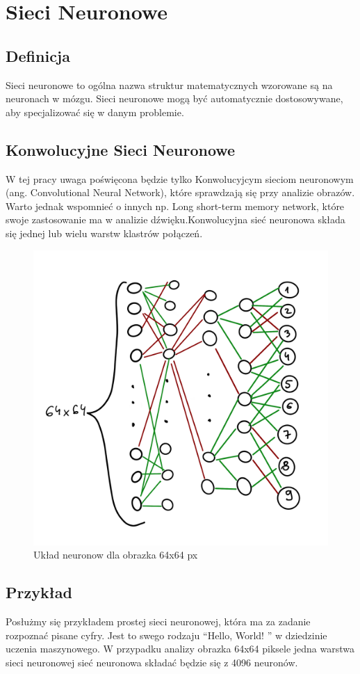 \documentclass[brudnopis]{xmgr}
\begin{document}
\chapter{Sieci Neuronowe  }

\section{Definicja\label{s:dsssl}}
Sieci neuronowe to ogólna nazwa struktur matematycznych wzorowane są na neuronach w mózgu. Sieci neuronowe mogą być automatycznie dostosowywane, aby specjalizować się w danym problemie.

\section{Konwolucyjne Sieci Neuronowe  \label{s:dsssl}}
W tej pracy uwaga poświęcona będzie tylko Konwolucyjcym sieciom neuronowym (ang. Convolutional Neural Network), które sprawdzają się przy analizie obrazów.  Warto jednak wspomnieć o innych np. Long short-term memory network, które swoje zastosowanie ma w analizie dźwięku.Konwolucyjna sieć neuronowa składa się jednej lub wielu warstw klastrów połączeń.


\begin{figure}[!tbh]
\centering
\includegraphics[width=.8\hsize]{fig/2}
\caption{Układ neuronow dla obrazka 64x64 px\label{RYS.2}}
\end{figure}


\section{Przykład  \label{s:dsssl}}
Posłużmy się przykładem prostej sieci neuronowej, która ma za zadanie rozpoznać pisane cyfry. Jest to swego rodzaju “Hello, World! ” w dziedzinie uczenia maszynowego.
W przypadku analizy obrazka 64x64 piksele jedna warstwa sieci neuronowej sieć neuronowa składać będzie się z 4096 neuronów.
\end{document}
